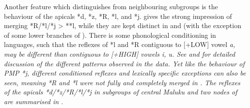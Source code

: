 \clearpage
{}
Another feature which distinguishes  from neighbouring
subgroups is the behaviour of the apicals *d,
*z, *R, *l, and *j.
 gives the strong impression of merging *R/*l/*j
> **l, while they are kept distinct in 
and  (with the exception of some
lower branches of ).
There is some phonological conditioning in 
languages, such that the reflexes of *l
and *R contiguous to [+LOW] vowel \it{a},
may be different than contiguous to [+HIGH] vowels \it{i, u}.
See  and \citet[23--33]{Stresemann1927} for detailed
discussion of the different patterns observed in the data.
Yet like the behaviour of PMP *j,
different conditioned reflexes and lexically specific exceptions
can also be seen,
meaning *R and *l were not fully
and completely merged in .
The reflexes of the apicals *d/*z/*R/*l/*j in subgroups of central
Maluku and two nodes of  are summarised in .


